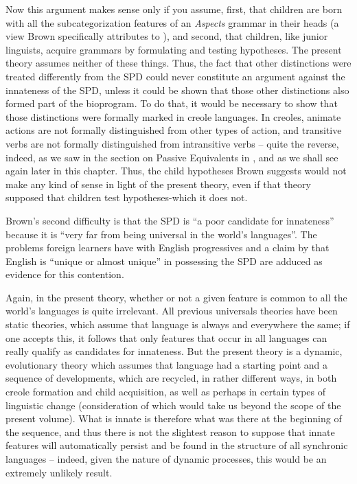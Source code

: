 Now this argument makes sense only if you assume, first, that
children are born with all the subcategorization features of an \textit{Aspects} grammar in their heads (a view Brown specifically attributes to \citealt{McNeill1966}), and second, that children, like junior linguists, acquire grammars by formulating and testing hypotheses. The present theory assumes neither of these things. Thus, the fact that other distinctions were treated differently from the SPD could never constitute an argument against the innateness of the SPD, unless it could be shown that those other distinctions also formed part of the bioprogram. To do that, it would be necessary to show that those distinctions were formally marked in creole languages. In creoles, animate actions are not formally distinguished from other types of action, and transitive verbs are not formally distinguished from intransitive verbs -- quite the reverse, indeed, as we saw in the section on Passive Equivalents in , and as we shall see again later in this chapter. Thus, the child hy\-potheses Brown suggests would not make any kind of sense in light of the present theory, even if that theory supposed that children test hypotheses-which it does not.

Brown's second difficulty is that the SPD is ``a poor candidate for innateness'' because it is ``very far from being universal in the world's languages''. The problems foreign learners have with English progressives and a claim by \citet{Joos1964} that English is ``unique or almost unique'' in possessing the SPD are adduced as evidence for this contention.

Again, in the present theory, whether or not a given feature is common to all the world's languages is quite irrelevant. All previous universals theories have been static theories, which assume that lan\-guage is always and everywhere the same; if one accepts this, it follows that only features that occur in all languages can really qualify as can\-didates for innateness. But the present theory is a dynamic, evolu\-tionary theory which assumes that language had a starting point and a sequence of developments, which are recycled, in rather different ways, in both creole formation and child acquisition, as well as perhaps in certain types of linguistic change (consideration of which would take us beyond the scope of the present volume). What is innate is therefore
what was there at the beginning of the sequence, and thus there is not the slightest reason to suppose that innate features will automati\-cally persist and be found in the structure of all synchronic languages -- indeed, given the nature of dynamic processes, this would be an extremely unlikely result.

